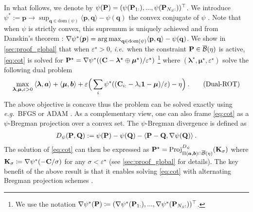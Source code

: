 In what follows, we denote by $\psi({\mathbf{P}}) = (\psi({\mathbf{P}}_{1:}), ..., \psi({\mathbf{P}}_{N_S:}))^\top$.
We introduce $\psi^*:= \mathbf{p} \to \sup_{\mathbf{q} \in \mathrm{dom}(\psi)} \langle \mathbf{p}, \mathbf{q} \rangle - \psi(\mathbf{q})$ the convex conjugate of $\psi$ \cite{rockafellar1997convex}.
Note that when $\psi$ is strictly convex, this supremum is uniquely achieved and from Danskin's theorem \cite{danskin1966theory}: $\nabla \psi^*(\bm{p}) = \operatorname*{arg\,max}_{\mathbf{q} \in \mathrm{dom}(\psi)} \langle \mathbf{p}, \mathbf{q} \rangle - \psi(\mathbf{q})$. 
We show in \cref{sec:proof_global} that when $\varepsilon^\star > 0$, \textit{i.e.}\ when the constraint ${\mathbf{P}} \in \overline{\mathcal{B}}(\eta)$ is active, \eqref{eq:cot} is solved for ${\mathbf{P}}^\star = \nabla \psi^*(({\mathbf{C}} - \bm{\lambda}^\star \oplus \bm{\mu}^\star) / \varepsilon^\star)$ \footnote{We use the notation $\nabla \psi^*({\mathbf{P}}) \coloneqq (\nabla \psi^*({\mathbf{P}}_{1:}), ..., \nabla \psi^*({\mathbf{P}}_{N_S:}))^\top$.} where $(\bm{\lambda}^\star, \bm{\mu}^\star, \varepsilon^\star)$ solve the following dual problem 
\begin{align}
    \max_{\bm{\lambda}, \bm{\mu}, \varepsilon>0}  \: \langle \bm{\lambda}, \bm{a} \rangle + \langle \bm{\mu}, \bm{b} \rangle + \varepsilon \Big(\sum_i \psi^*(({\mathbf{C}}_{i:} - \lambda_i \bm{1} - \bm{\mu}) / \varepsilon) - \eta \Big) \:.
    \tag{Dual-ROT}
\end{align}
The above objective is concave thus the problem can be solved exactly using \textit{e.g.}\ BFGS \cite{liu1989limited} or ADAM \cite{kingma2014adam}.
As a complementary view, one can also frame \eqref{eq:cot} as a $\psi$-Bregman projection over a convex set. The $\psi$-Bregman divergence is defined as 
\begin{align}
    D_\psi({\mathbf{P}}, {\mathbf{Q}}) := \psi({\mathbf{P}}) - \psi({\mathbf{Q}}) - \langle {\mathbf{P}} - {\mathbf{Q}}, \nabla \psi({\mathbf{Q}}) \rangle \:.
\end{align}
The solution of \eqref{eq:cot} can then be expressed as
${\mathbf{P}}^\star = \operatorname{Proj}^{D_\psi}_{\Pi(\bm{a}, \bm{b}) \cap \overline{\mathcal{B}}(\eta)}({\mathbf{K}}_\sigma)$
where ${\mathbf{K}}_\sigma \coloneqq \nabla \psi^*(- {\mathbf{C}} / \sigma)$ for any $\sigma < \varepsilon^\star$ (see \cref{sec:proof_global} for details). The key benefit of the above result is that it enables solving \eqref{eq:cot} with alternating Bregman projection schemes \cite{benamou2015iterative}.

